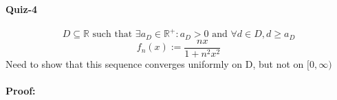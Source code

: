\documentclass[20pt]{extarticle} %
\begin{document}
\paragraph{Quiz-4}

\[D \subseteq \mathbb{R} \text{ such that } \exists a_D \in \mathbb{R^+}: a_D >0 \text{ and }  \forall d \in D, d \geq a_D    \]
\[  f_n(x):= \frac{nx}{1+n^2x^2}   \]
Need to show that this sequence converges uniformly on D, but not on $[0,\infty)$\\\\
\textbf{Proof:}
\end{document}

